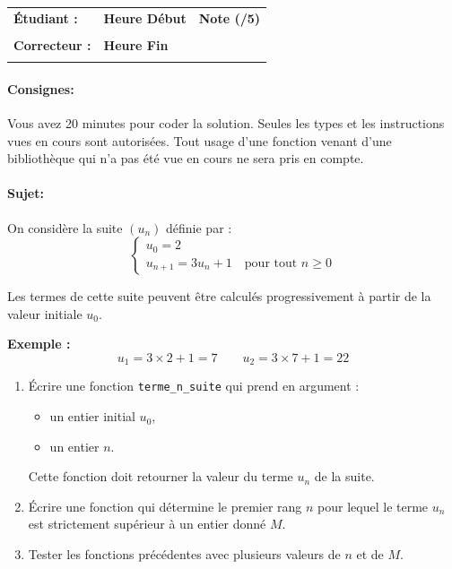 \documentclass[a4paper,11pt]{article}
\begin{document}
\vspace{-0.3 cm}

\begin{table}[h!]
\centering
\renewcommand{\arraystretch}{1.4} %
\begin{tabular}{|p{10cm}|p{3cm}|p{2cm}|}
\hline
\textbf{Étudiant :} & \textbf{Heure Début }  & \textbf{Note (/5) }  \\
& & \\
\hline
\textbf{Correcteur :} & \textbf{Heure Fin } & \\
& & \\
\hline

\hline
\end{tabular}
\end{table}
\vspace{-0.4 cm}
\paragraph*{Consignes:} Vous avez 20 minutes pour coder la solution. Seules les types et les instructions vues en cours sont autorisées. Tout usage d'une fonction 
venant d'une bibliothèque qui n'a pas été vue en cours ne sera pris en compte. 

\vspace{-0.2 cm}
\paragraph*{Sujet:}


On considère la suite $(u_n)$ définie par :
\[
\begin{cases}
u_0 = 2 \\
u_{n+1} = 3u_n + 1 \quad \text{pour tout } n \geq 0
\end{cases}
\]

Les termes de cette suite peuvent être calculés progressivement à partir de la valeur initiale $u_0$.

\bigskip

\textbf{Exemple :}
\[
u_1 = 3 \times 2 + 1 = 7 \qquad
u_2 = 3 \times 7 + 1 = 22
\]

\bigskip

\begin{enumerate}


\item Écrire une fonction \texttt{terme\_n\_suite} qui prend en argument :
\begin{itemize}
    \item un entier initial $u_0$,
    \item un entier $n$.
\end{itemize}
Cette fonction doit retourner la valeur du terme $u_n$ de la suite.

\item Écrire une fonction qui détermine le premier rang $n$ pour lequel le terme $u_n$ est strictement supérieur à un entier donné $M$.

\item Tester les fonctions précédentes avec plusieurs valeurs de $n$ et de $M$.
\end{enumerate}
\end{document}

